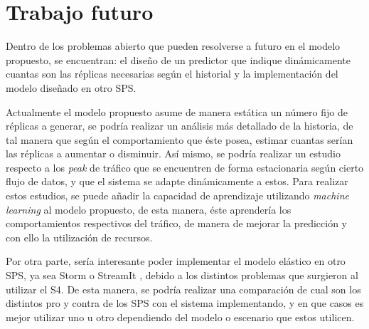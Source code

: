 \section{Trabajo futuro}

Dentro de los problemas abierto que pueden resolverse a futuro en el modelo propuesto, se encuentran: el diseño de un predictor que indique dinámicamente cuantas son las réplicas necesarias según el historial y la implementación del modelo diseñado en otro SPS.


Actualmente el modelo propuesto asume de manera estática un número fijo de réplicas a generar, se podría realizar un análisis más detallado de la historia, de tal manera que según el comportamiento que éste posea, estimar cuantas serían las réplicas a aumentar o disminuir. Así mismo, se podría realizar un estudio respecto a los \textit{peak} de tráfico que se encuentren de forma estacionaria según cierto flujo de datos, y que el sistema se adapte dinámicamente a estos. Para realizar estos estudios, se puede añadir la capacidad de aprendizaje utilizando \textit{machine learning} \citep{bookMohri2012} al modelo propuesto, de esta manera, éste aprendería los comportamientos respectivos del tráfico, de manera de mejorar la predicción y con ello la utilización de recursos.


Por otra parte, sería interesante poder implementar el modelo elástico en otro SPS, ya sea Storm \citep{stormtwitter} o StreamIt \citep{ThiesKA02}, debido a los distintos problemas que surgieron al utilizar el S4. De esta manera, se podría realizar una comparación de cual son los distintos pro y contra de los SPS con el sistema implementando, y en que casos es mejor utilizar uno u otro dependiendo del modelo o escenario que estos utilicen.